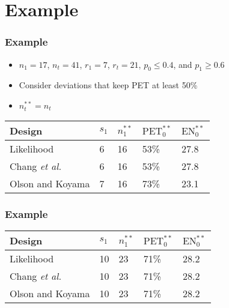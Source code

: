 \documentclass{beamer}\usepackage[]{graphicx}\usepackage[]{color}
\begin{document}
\section{Example}
\begin{frame}
\frametitle{Example}
    \begin{itemize}
        \item $n_1 = 17$, $n_t = 41$, $r_1 = 7$, $r_t = 21$, $p_0 \leq 0.4$, and $p_1 \geq 0.6$
        \item Consider deviations that keep PET at least 50\%
        \item $n_t^{\ast\ast} = n_t$
    \end{itemize}
\begin{table}[]
\begin{tabular}{lllll}
Design                  & $s_1$ & $n_1^{\ast\ast}$ & $\mbox{PET}^{\ast\ast}_0$ & $\mbox{EN}^{\ast\ast}_0$ \\ \hline
Likelihood              & 6     & 16    & 53\%           & 27.8          \\
Chang \textit{et al.} & 6     & 16    & 53\%           & 27.8          \\
Olson and Koyama        & 7     & 16    & 73\%           & 23.1         
\end{tabular}
\end{table}
\end{frame}%

\begin{frame}
\frametitle{Example}
\begin{table}[]
\begin{tabular}{lllll}
Design                  & $s_1$ & $n_1^{\ast\ast}$ & $\mbox{PET}^{\ast\ast}_0$ & $\mbox{EN}^{\ast\ast}_0$ \\ \hline
Likelihood              & 10     & 23    & 71\%           & 28.2          \\
Chang \textit{et al.}   & 10     & 23    & 71\%           & 28.2          \\
Olson and Koyama        & 10     & 23    & 71\%           & 28.2         
\end{tabular}
\end{table}
\end{frame}
\end{document}
